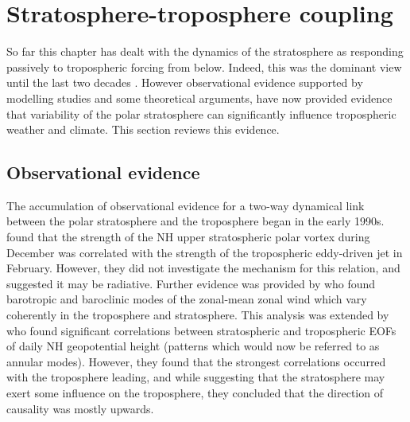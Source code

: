 \section{Stratosphere-troposphere coupling}
\label{sec:strat-trop-coupl}

So far this chapter has dealt with the dynamics of the stratosphere as
responding passively to tropospheric forcing from below. Indeed, this was the
dominant view until the last two decades \citep[e.g.,][]{Andrews1987}. However
observational evidence supported by modelling studies and some theoretical
arguments, have now provided evidence that variability of the polar stratosphere
can significantly influence tropospheric weather and climate. This section
reviews this evidence.



\subsection{Observational evidence}
\label{sec:observ-evid}

The accumulation of observational evidence for a two-way dynamical link between
the polar stratosphere and the troposphere began in the early
1990s. \citet{Kodera1990} found that the strength of the NH upper stratospheric
polar vortex during December was correlated with the strength of the
tropospheric eddy-driven jet in February. However, they did not investigate the
mechanism for this relation, and suggested it may be radiative. Further evidence
was provided by \citet{Nigam1990} who found barotropic and baroclinic modes of
the zonal-mean zonal wind which vary coherently in the troposphere and
stratosphere. This analysis was extended by \citet{Baldwin1994} who found
significant correlations between stratospheric and tropospheric EOFs of daily NH
geopotential height (patterns which would now be referred to as annular
modes). However, they found that the strongest correlations occurred with the
troposphere leading, and while suggesting that the stratosphere may exert some
influence on the troposphere, they concluded that the direction of causality was
mostly upwards.

